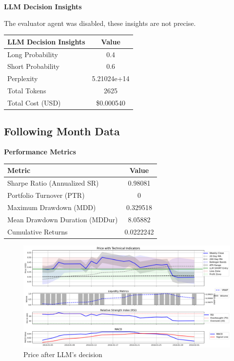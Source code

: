 \documentclass[8pt]{scrartcl}
\begin{document}
\textbf{LLM Decision Insights}

The evaluator agent was disabled, these insights are not precise.

\begin{longtable}{l c}
\toprule
\textbf{LLM Decision Insights} & \textbf{Value} \\
\midrule
Long Probability & 0.4 \\
Short Probability & 0.6 \\
Perplexity & 5.21024e+14   \\
\midrule
Total Tokens & 2625 \\
Total Cost (USD) & \$0.000540 \\
\bottomrule
\end{longtable}

\subsection*{Following Month Data}

\textbf{Performance Metrics}

\begin{longtable}{l c}
\toprule
\textbf{Metric} & \textbf{Value} \\
\midrule
Sharpe Ratio (Annualized SR) & 0.98081 \\
Portfolio Turnover (PTR) & 0 \\
Maximum Drawdown (MDD) & 0.329518 \\
Mean Drawdown Duration (MDDur) & 8.05882 \\
Cumulative Returns & 0.0222242 \\
\bottomrule
\end{longtable}


\begin{figure}[H]
    \centering
    \includegraphics[width=1\linewidth]{judge_reviews/META_M_gpt-4o-mini/2016-01-04/llm_Price_with_Technical_Indicators.png}
    \caption{Price after LLM's decision}
\end{figure}
\end{document}
